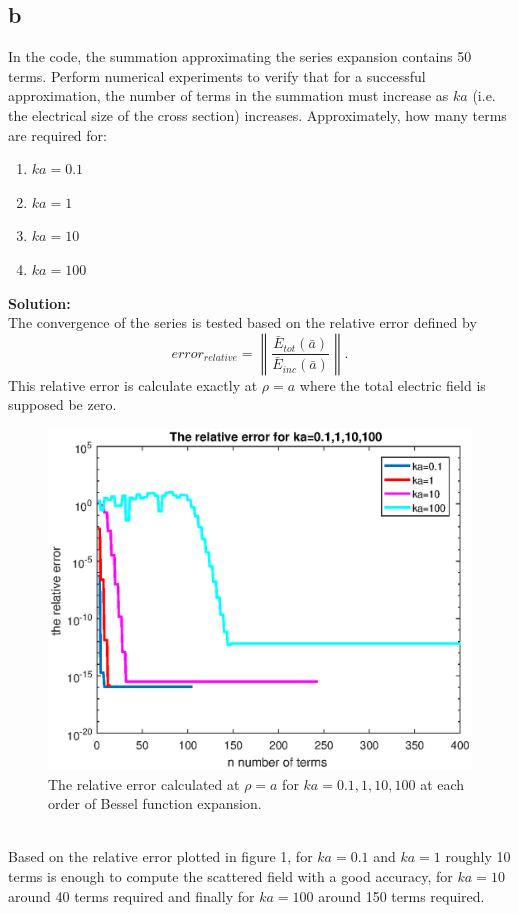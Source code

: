 \documentclass[11pt]{amsart}
\begin{document}
\subsection*{b}
In the code, the summation approximating the series expansion contains 50 terms.
Perform numerical experiments to verify that for a successful approximation, the
number of terms in the summation must increase as $ka$ (i.e. the electrical size of the
cross section) increases. Approximately, how many terms are required for:
\begin{enumerate}
\item $ka=0.1$
\item $ka=1$
\item $ka=10$
\item $ka=100$
\end{enumerate}
\textbf{Solution:}\\
The convergence of the series is tested based on the relative error defined by 
\begin{equation}
\label{eq:9}
error_{relative}=\left \| \frac{\bar{E}_{tot}(\bar{a})}{\bar{E}_{inc}(\bar{a})} \right \|.
\end{equation}
This relative error is calculate exactly at $\rho=a$ where the total electric field is supposed be zero.
\begin{figure}[!h]
\label{fig:1}
  \centering    
    \includegraphics[scale=0.7]{ScatRelative}   
  \caption{The relative error calculated at $\rho=a$ for $ka=0.1,1,10,100$ at each order of Bessel function expansion.}           
\end{figure}
\\
Based on the relative error plotted in figure 1, for $ka=0.1$ and $ka=1$ roughly 10 terms is enough to compute the scattered field with a good accuracy, for $ka=10$ around 40 terms required and finally for $ka=100$ around 150 terms required.
\end{document}
